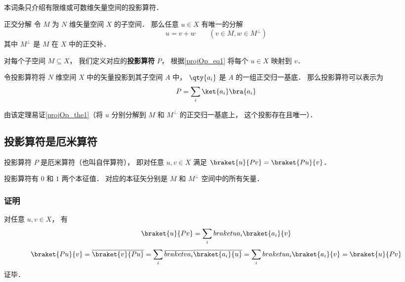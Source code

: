 

本词条只介绍有限维或可数维矢量空间的投影算符．

\begin{theorem}{正交分解}\label{projOp_the1}
令 $M$ 为 $N$ 维矢量空间 $X$ 的子空间． 那么任意 $u\in X$ 有唯一的分解
\begin{equation}\label{projOp_eq1}
u = v + w \qquad (v\in M, w\in M^\bot)
\end{equation}
其中 $M^\bot$ 是 $M$ 在 $X$ 中的正交补．
\end{theorem}

对每个子空间 $M\subseteq X$， 我们定义对应的\textbf{投影算符} $P$， 根据\autoref{projOp_eq1} 将每个 $u\in X$ 映射到 $v$．

\begin{theorem}{}
令投影算符将 $N$ 维空间 $X$ 中的矢量投影到其子空间 $A$ 中， $\qty{a_i}$ 是 $A$ 的一组正交归一基底． 那么投影算符可以表示为
\begin{equation}
P = \sum_i \ket{a_i}\bra{a_i}
\end{equation}
\end{theorem}
由该定理易证\autoref{projOp_the1}（将 $u$ 分别分解到 $M$ 和 $M^\bot$ 的正交归一基底上， 这个投影存在且唯一）．



\subsection{投影算符是厄米算符}
投影算符 $P$ 是厄米算符（也叫自伴算符）， 即对任意 $u, v\in X$ 满足 $\braket{u}{Pv} = \braket{Pu}{v}$．

投影算符有 $0$ 和 $1$ 两个本征值． 对应的本征矢分别是 $M$ 和 $M^\bot$ 空间中的所有矢量．

\subsubsection{证明}
对任意 $u, v\in X$， 有
\begin{equation}
\braket{u}{Pv} = \sum_i \\braket{u}{a_i}\braket{a_i}{v}
\end{equation}
\begin{equation}
\braket{Pu}{v} = \overline {\braket{v}{Pu}} = \sum_i \overline{\\braket{v}{a_i}}\overline{\braket{a_i}{u}} = \sum_i \\braket{u}{a_i}\braket{a_i}{v} = \braket{u}{Pv}
\end{equation}
证毕．
